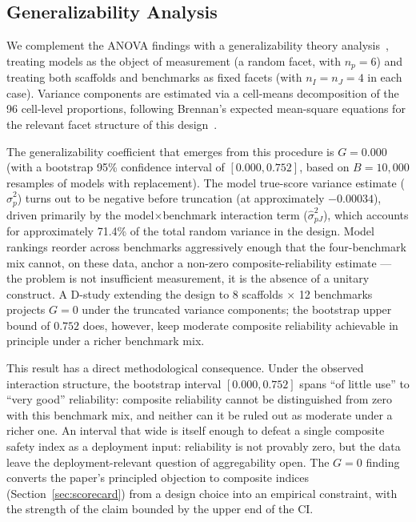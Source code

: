 \subsection{Generalizability Analysis}
\label{app:gtheory}

We complement the ANOVA findings with a generalizability theory analysis~\cite{cronbach1972dependability, brennan2001generalizability}, treating models as the object of measurement (a random facet, with $n_p = 6$) and treating both scaffolds and benchmarks as fixed facets (with $n_I = n_J = 4$ in each case).  Variance components are estimated via a cell-means decomposition of the 96 cell-level proportions, following Brennan's expected mean-square equations for the relevant facet structure of this design~\cite{brennan2001generalizability}.

The generalizability coefficient that emerges from this procedure is $G = 0.000$ (with a bootstrap 95\% confidence interval of $[0.000, 0.752]$, based on $B = 10{,}000$ resamples of models with replacement).  The model true-score variance estimate ($\hat{\sigma}^2_p$) turns out to be negative before truncation (at approximately $-0.00034$), driven primarily by the model$\times$benchmark interaction term ($\hat{\sigma}^2_{pJ}$), which accounts for approximately 71.4\% of the total random variance in the design.  Model rankings reorder across benchmarks aggressively enough that the four-benchmark mix cannot, on these data, anchor a non-zero composite-reliability estimate --- the problem is not insufficient measurement, it is the absence of a unitary construct.  A D-study extending the design to 8 scaffolds $\times$ 12 benchmarks projects $G = 0$ under the truncated variance components; the bootstrap upper bound of $0.752$ does, however, keep moderate composite reliability achievable in principle under a richer benchmark mix.

This result has a direct methodological consequence.  Under the observed interaction structure, the bootstrap interval $[0.000, 0.752]$ spans ``of little use'' to ``very good'' reliability: composite reliability cannot be distinguished from zero with this benchmark mix, and neither can it be ruled out as moderate under a richer one.  An interval that wide is itself enough to defeat a single composite safety index as a deployment input: reliability is not provably zero, but the data leave the deployment-relevant question of aggregability open.  The $G = 0$ finding converts the paper's principled objection to composite indices (Section~\ref{sec:scorecard}) from a design choice into an empirical constraint, with the strength of the claim bounded by the upper end of the CI.

